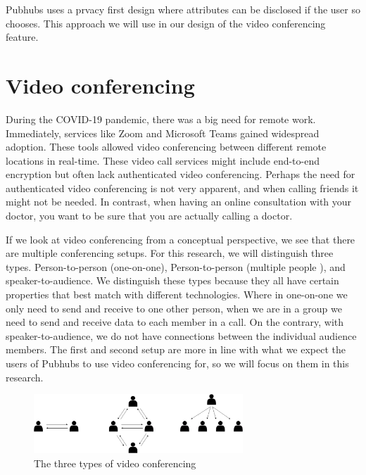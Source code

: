 \documentclass{report}
\begin{document}
    Pubhubs uses a prvacy first design where attributes can be disclosed if the user so chooses. This approach we will
    use in our design of the video conferencing feature.


    \section{Video conferencing}
    During the COVID-19 pandemic, there was a big need for remote work. Immediately, services like Zoom \cite{Zoom}
    and Microsoft Teams  \cite{MSTeams}
    gained widespread adoption. These tools allowed video conferencing between different remote locations in real-time.
    These video call services might include end-to-end encryption but often lack authenticated video conferencing.
    Perhaps the need for authenticated video conferencing is not very apparent, and when calling friends it might not be
    needed. In contrast, when having an online consultation with your doctor, you want to be sure that you are actually
    calling a doctor.


    If we look at video conferencing from a conceptual perspective, we see that there are multiple conferencing setups.
    For this research, we will distinguish three types. Person-to-person (one-on-one), Person-to-person (multiple people
    ), and speaker-to-audience. We distinguish these types because they all have certain properties that best match with
    different technologies. Where in one-on-one we only need to send and receive to one other person, when we are in a
    group we need to send and receive data to each member in a call. On the contrary, with speaker-to-audience, we do
    not have connections between the individual audience members. The first and second setup are more in line with what
    we expect the users of Pubhubs to use video conferencing for, so we will focus on them in this research.

    \begin{figure}[!hbt]
        \centering
        \includegraphics[width=0.7\textwidth]{img/three-types}
        \caption{The three types of video conferencing}
        \label{fig:enter-label}
    \end{figure}
\end{document}

